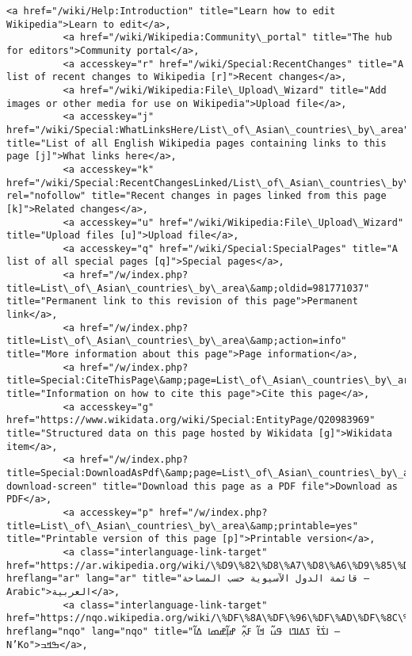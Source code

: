 \documentclass[11pt]{article}
\begin{document}
\begin{Verbatim}[commandchars=\\\{\}]
          <a href="/wiki/Help:Introduction" title="Learn how to edit Wikipedia">Learn to edit</a>,
          <a href="/wiki/Wikipedia:Community\_portal" title="The hub for editors">Community portal</a>,
          <a accesskey="r" href="/wiki/Special:RecentChanges" title="A list of recent changes to Wikipedia [r]">Recent changes</a>,
          <a href="/wiki/Wikipedia:File\_Upload\_Wizard" title="Add images or other media for use on Wikipedia">Upload file</a>,
          <a accesskey="j" href="/wiki/Special:WhatLinksHere/List\_of\_Asian\_countries\_by\_area" title="List of all English Wikipedia pages containing links to this page [j]">What links here</a>,
          <a accesskey="k" href="/wiki/Special:RecentChangesLinked/List\_of\_Asian\_countries\_by\_area" rel="nofollow" title="Recent changes in pages linked from this page [k]">Related changes</a>,
          <a accesskey="u" href="/wiki/Wikipedia:File\_Upload\_Wizard" title="Upload files [u]">Upload file</a>,
          <a accesskey="q" href="/wiki/Special:SpecialPages" title="A list of all special pages [q]">Special pages</a>,
          <a href="/w/index.php?title=List\_of\_Asian\_countries\_by\_area\&amp;oldid=981771037" title="Permanent link to this revision of this page">Permanent link</a>,
          <a href="/w/index.php?title=List\_of\_Asian\_countries\_by\_area\&amp;action=info" title="More information about this page">Page information</a>,
          <a href="/w/index.php?title=Special:CiteThisPage\&amp;page=List\_of\_Asian\_countries\_by\_area\&amp;id=981771037\&amp;wpFormIdentifier=titleform" title="Information on how to cite this page">Cite this page</a>,
          <a accesskey="g" href="https://www.wikidata.org/wiki/Special:EntityPage/Q20983969" title="Structured data on this page hosted by Wikidata [g]">Wikidata item</a>,
          <a href="/w/index.php?title=Special:DownloadAsPdf\&amp;page=List\_of\_Asian\_countries\_by\_area\&amp;action=show-download-screen" title="Download this page as a PDF file">Download as PDF</a>,
          <a accesskey="p" href="/w/index.php?title=List\_of\_Asian\_countries\_by\_area\&amp;printable=yes" title="Printable version of this page [p]">Printable version</a>,
          <a class="interlanguage-link-target" href="https://ar.wikipedia.org/wiki/\%D9\%82\%D8\%A7\%D8\%A6\%D9\%85\%D8\%A9\_\%D8\%A7\%D9\%84\%D8\%AF\%D9\%88\%D9\%84\_\%D8\%A7\%D9\%84\%D8\%A2\%D8\%B3\%D9\%8A\%D9\%88\%D9\%8A\%D8\%A9\_\%D8\%AD\%D8\%B3\%D8\%A8\_\%D8\%A7\%D9\%84\%D9\%85\%D8\%B3\%D8\%A7\%D8\%AD\%D8\%A9" hreflang="ar" lang="ar" title="قائمة الدول الآسيوية حسب المساحة – Arabic">العربية</a>,
          <a class="interlanguage-link-target" href="https://nqo.wikipedia.org/wiki/\%DF\%8A\%DF\%96\%DF\%AD\%DF\%8C\%DF\%AB\_\%DF\%96\%DF\%A1\%DF\%8A\%DF\%A3\%DF\%8A\_\%DF\%9F\%DF\%8E\%DF\%AC\_\%DF\%9E\%DF\%8A\%DF\%AC\_\%DF\%93\%DF\%8D\%DF\%B2\%DF\%AC\_\%DF\%9D\%DF\%8A\%DF\%B2\%DF\%AC\%DF\%9D\%DF\%98\%DF\%8A\_\%DF\%A1\%DF\%8A\%DF\%AC" hreflang="nqo" lang="nqo" title="ߊߖ߭ߌ߫ ߖߡߊߣߊ ߟߎ߬ ߞߊ߬ ߓߍ߲߬ ߝߊ߲߬ߝߘߊ ߡߊ߬ – N’Ko">ߒߞߏ</a>,

\end{Verbatim}
\end{document}
